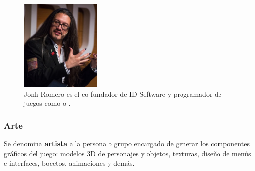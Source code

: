 \begin{figure}[h]
    \centering
    \includegraphics[width=0.35\textwidth]{images/estadodelarte/desarrollo/john-romero}
    \caption{Jonh Romero es el co-fundador de ID Software y programador de juegos como  o .}
\end{figure}

\subsubsection{Arte}
Se denomina \textbf{artista} a la persona o grupo encargado de generar los componentes gráficos del juego: modelos 3D de personajes y objetos, texturas, diseño de menús e interfaces, bocetos, animaciones y demás.

